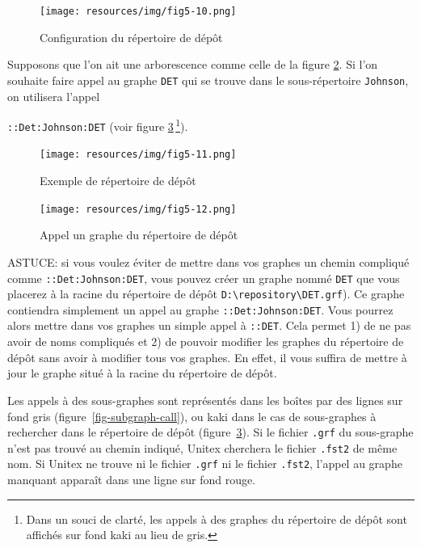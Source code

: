 \begin{figure}[!ht]
\begin{center}
\texttt{[image: resources/img/fig5-10.png]}
\caption{Configuration du répertoire de dépôt\label{directories}}
\end{center}
\end{figure}

\bigskip
\noindent Supposons que l’on ait une arborescence comme celle de la figure \ref{repository}. Si l’on
souhaite faire appel au graphe \verb+DET+ qui se trouve dans le sous-répertoire \verb+Johnson+, on
utilisera l’appel

\noindent \verb+::Det:Johnson:DET+
(voir figure \ref{repository-graph-call}\,\footnote{Dans un souci de clarté, les appels
à des graphes du répertoire de dépôt sont affichés sur fond kaki au lieu de gris.}).

\begin{figure}[!ht]
\begin{center}
\texttt{[image: resources/img/fig5-11.png]}
\caption{Exemple de répertoire de dépôt\label{repository}}
\end{center}
\end{figure}

\begin{figure}[!ht]
\begin{center}
\texttt{[image: resources/img/fig5-12.png]}
\caption{Appel un graphe du répertoire de dépôt\label{repository-graph-call}}
\end{center}
\end{figure}

\bigskip
\noindent ASTUCE: si vous voulez éviter de mettre dans vos graphes un chemin compliqué
comme \verb+::Det:Johnson:DET+, vous pouvez créer un graphe nommé \verb+DET+ que vous placerez à la
racine du répertoire de dépôt \verb+D:\repository\DET.grf+). Ce graphe contiendra simplement
un appel au graphe \verb+::Det:Johnson:DET+. Vous pourrez alors mettre dans vos graphes un simple
appel à \verb+::DET+. Cela permet 1) de ne pas avoir de noms compliqués et 2) de pouvoir modifier
les graphes du répertoire de dépôt sans avoir à modifier tous vos graphes. En effet, il vous suffira
de mettre à jour le graphe situé à la racine du répertoire de dépôt.

\bigskip
\noindent Les appels à des sous-graphes sont représentés dans les boîtes par des lignes
sur fond gris (figure~\ref{fig-subgraph-call}), ou kaki dans le cas de sous-graphes à rechercher dans le 
répertoire de dépôt (figure~\ref{repository-graph-call}). Si le fichier \verb+.grf+ du sous-graphe n'est pas trouvé au chemin indiqué,
Unitex cherchera le fichier \verb+.fst2+ de même nom. Si Unitex ne trouve ni le fichier \verb+.grf+
ni le fichier \verb+.fst2+, l'appel au graphe manquant apparaît dans une ligne sur fond rouge.

